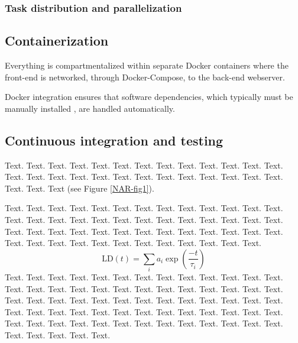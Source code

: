 \documentclass[a4,center,fleqn]{NAR}
\begin{document}
\subsubsection{Task distribution and parallelization}

\subsection{Containerization}

Everything is compartmentalized within separate Docker containers where the front-end is networked, through Docker-Compose, to the back-end webserver.

Docker integration ensures that software dependencies, which typically must be manually installed \cite{doi:10.1093/bioinformatics/btu153,laing2010pan,inouye2014srst2}, are handled automatically.



\subsection{Continuous integration and testing}

Text. Text. Text. Text. Text. Text. Text. Text. Text. Text. Text.
Text. Text. Text. Text. Text. Text. Text. Text. Text. Text. Text.
Text. Text. Text. Text. Text. Text. Text
(see Figure \ref{NAR-fig1}).

Text. Text. Text. Text. Text. Text. Text. Text. Text. Text. Text.
Text. Text. Text. Text. Text. Text. Text. Text. Text. Text. Text.
Text. Text. Text. Text. Text. Text. Text. Text. Text. Text. Text.
Text. Text. Text. Text. Text. Text. Text. Text. Text. Text. Text.
Text. Text. Text. Text. Text. Text. Text.
\begin{equation*}
\mathrm{LD} \left( t \right) =
\sum\limits_i
a_i \exp \left( \frac{-t}{\tau_i} \right)
\end{equation*}
Text. Text. Text. Text. Text. Text. Text. Text. Text. Text. Text.
Text. Text. Text. Text. Text. Text. Text. Text. Text. Text. Text.
Text. Text. Text. Text. Text. Text. Text. Text. Text. Text. Text.
Text. Text. Text. Text. Text. Text. Text. Text. Text. Text. Text.
Text. Text. Text. Text. Text. Text. Text. Text. Text. Text. Text.
Text. Text. Text. Text. Text. Text. Text. Text. Text. Text. Text.
Text. Text. Text. Text.
\end{document}
